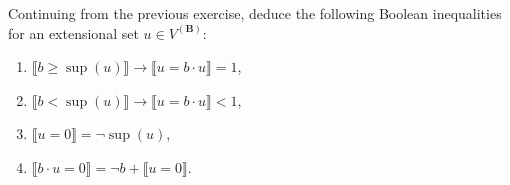 Continuing from the previous exercise, deduce the following Boolean inequalities for an extensional set $u \in V^{(\mathbf{B})}$:
\begin{enumerate}
\item $\llbracket b \geq \sup(u) \rrbracket \to \llbracket u = b \cdot u \rrbracket = 1$,
\item $\llbracket b < \sup(u) \rrbracket \to \llbracket u = b \cdot u \rrbracket < 1$,
\item $\llbracket u = 0 \rrbracket = \neg \sup(u)$,
\item $\llbracket b \cdot u = 0 \rrbracket = \neg b + \llbracket u = 0 \rrbracket$.
\end{enumerate}
